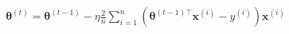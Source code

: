 \documentclass[preview]{standalone}
\begin{document}
\begin{align*}
\mathbf{\theta}^{(t)} = \mathbf{\theta}^{(t-1)} - \eta \frac{2}{n} \sum_{i=1}^{n} \left(\mathbf{\theta}^{(t-1)\top}\mathbf{x}^{(i)} - y^{(i)}\right)\mathbf{x}^{(i)}
\end{align*}
\end{document}
